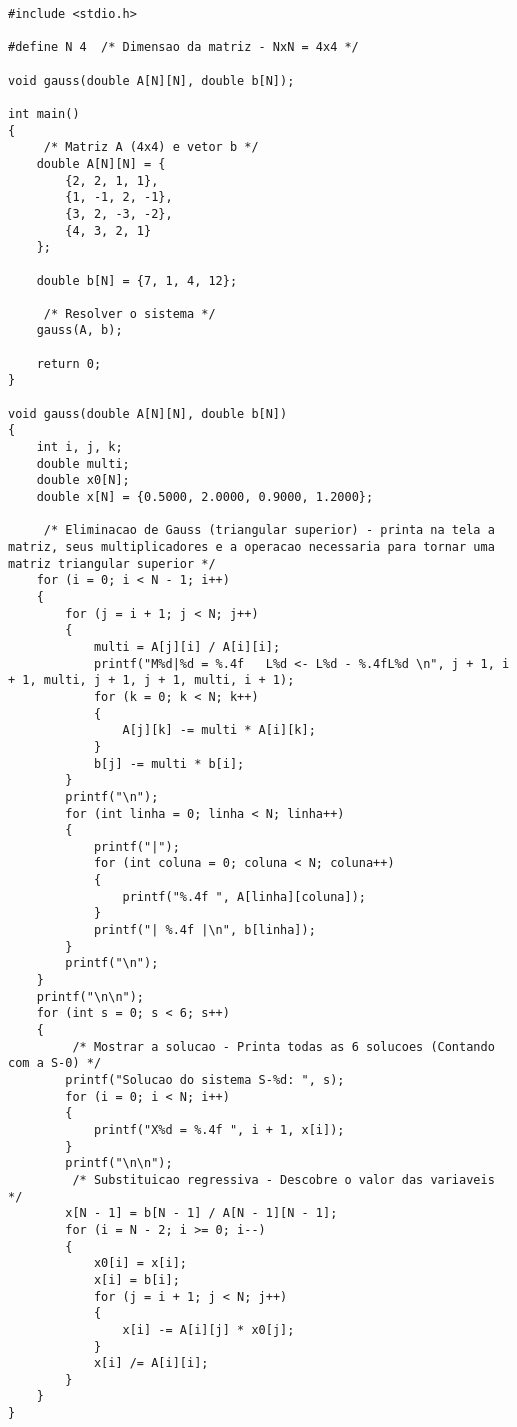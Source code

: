 \documentclass[12pt,a4paper]{article}
\begin{document}
            \begin{verbatim}
#include <stdio.h>

#define N 4  /* Dimensao da matriz - NxN = 4x4 */

void gauss(double A[N][N], double b[N]);

int main()
{
     /* Matriz A (4x4) e vetor b */
    double A[N][N] = {
        {2, 2, 1, 1},
        {1, -1, 2, -1},
        {3, 2, -3, -2},
        {4, 3, 2, 1}
    };

    double b[N] = {7, 1, 4, 12};

     /* Resolver o sistema */
    gauss(A, b);

    return 0;
}

void gauss(double A[N][N], double b[N])
{
    int i, j, k;
    double multi;
    double x0[N];
    double x[N] = {0.5000, 2.0000, 0.9000, 1.2000};

     /* Eliminacao de Gauss (triangular superior) - printa na tela a matriz, seus multiplicadores e a operacao necessaria para tornar uma matriz triangular superior */
    for (i = 0; i < N - 1; i++)
    {
        for (j = i + 1; j < N; j++)
        {
            multi = A[j][i] / A[i][i];
            printf("M%d|%d = %.4f   L%d <- L%d - %.4fL%d \n", j + 1, i + 1, multi, j + 1, j + 1, multi, i + 1);
            for (k = 0; k < N; k++)
            {
                A[j][k] -= multi * A[i][k];
            }
            b[j] -= multi * b[i];
        }
        printf("\n");
        for (int linha = 0; linha < N; linha++)
        {
            printf("|");
            for (int coluna = 0; coluna < N; coluna++)
            {
                printf("%.4f ", A[linha][coluna]);
            }
            printf("| %.4f |\n", b[linha]);
        }
        printf("\n");
    }
    printf("\n\n");
    for (int s = 0; s < 6; s++)
    {
         /* Mostrar a solucao - Printa todas as 6 solucoes (Contando com a S-0) */
        printf("Solucao do sistema S-%d: ", s);
        for (i = 0; i < N; i++)
        {
            printf("X%d = %.4f ", i + 1, x[i]);
        }
        printf("\n\n");
         /* Substituicao regressiva - Descobre o valor das variaveis */
        x[N - 1] = b[N - 1] / A[N - 1][N - 1];
        for (i = N - 2; i >= 0; i--)
        {
            x0[i] = x[i];
            x[i] = b[i];
            for (j = i + 1; j < N; j++)
            {
                x[i] -= A[i][j] * x0[j];
            }
            x[i] /= A[i][i];
        }
    }
}
            \end{verbatim}
\end{document}
